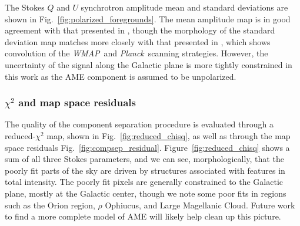 \documentclass[twocolumn]{../../common/aa}
\def\WMAP{\emph{WMAP}}
\def\Planck{\emph{Planck}}
\begin{document}
The Stokes $Q$ and $U$ synchrotron amplitude mean and standard deviations are shown in Fig.~\ref{fig:polarized_foregrounds}. The mean amplitude map is in good agreement with that presented in \cite{bp14}, though the morphology of the standard deviation map matches more closely with that presented in \cite{bp15}, which shows convolution of the \WMAP\ and \Planck\ scanning strategies. However, the uncertainty of the signal along the Galactic plane is more tightly constrained in this work as the AME component is assumed to be unpolarized.

\subsubsection{$\chi^2$ and map space residuals}\label{subsub:compsep_chisq}

The quality of the component separation procedure is evaluated through a reduced-$\chi^2$   map, shown in Fig.~\ref{fig:reduced_chisq}, as well as through the map space residuals Fig.~\ref{fig:compsep_residual}. Figure~\ref{fig:reduced_chisq} shows a sum of all three Stokes parameters, and we can see, morphologically, that the poorly fit parts of the sky are driven by structures associated with features in total intensity. The poorly fit pixels are generally constrained to the Galactic plane, mostly at the Galactic center, though we note some poor fits in regions such as the Orion region, $\rho$ Ophiucus, and Large Magellanic Cloud. Future work to find a more complete model of AME will likely help clean up this picture.

\end{document}
